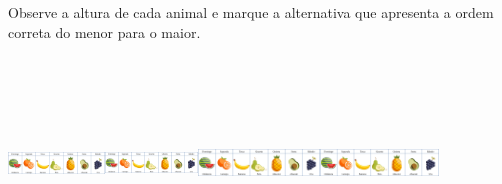 \begin{escolha}
\begin{escolha}
{{{{Observe a altura de cada animal e marque a alternativa que apresenta a
ordem correta do menor para o maior.

\includegraphics[width=1.01000in,height=2.21875in]{media/image143.png}\includegraphics[width=0.97225in,height=2.21875in]{media/image143.png}\includegraphics[width=1.26550in,height=2.21875in]{media/image143.png}\includegraphics[width=1.24230in,height=2.21875in]{media/image143.png}

}}}}
\end{escolha}
\end{escolha}
